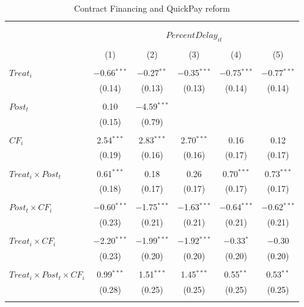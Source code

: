 \documentclass[
]{article}
\begin{document}
\begin{table}[H] \centering 
  \caption{Contract Financing and QuickPay reform} 
  \label{} 
\small 
\begin{tabular}{@{\extracolsep{-2pt}}lccccc} 
\\[-1.8ex]\hline 
\hline \\[-1.8ex] 
\\[-1.8ex] & \multicolumn{5}{c}{$PercentDelay_{it}$  } \\ 
\\[-1.8ex] & (1) & (2) & (3) & (4) & (5)\\ 
\hline \\[-1.8ex] 
 $Treat_i$ & $-$0.66$^{***}$ & $-$0.27$^{**}$ & $-$0.35$^{***}$ & $-$0.75$^{***}$ & $-$0.77$^{***}$ \\ 
  & (0.14) & (0.13) & (0.13) & (0.14) & (0.14) \\ 
  & & & & & \\ 
 $Post_t$ & 0.10 & $-$4.59$^{***}$ &  &  &  \\ 
  & (0.15) & (0.79) &  &  &  \\ 
  & & & & & \\ 
 $CF_i$ & 2.54$^{***}$ & 2.83$^{***}$ & 2.70$^{***}$ & 0.16 & 0.12 \\ 
  & (0.19) & (0.16) & (0.16) & (0.17) & (0.17) \\ 
  & & & & & \\ 
 $Treat_i \times Post_t$ & 0.61$^{***}$ & 0.18 & 0.26 & 0.70$^{***}$ & 0.73$^{***}$ \\ 
  & (0.18) & (0.17) & (0.17) & (0.17) & (0.17) \\ 
  & & & & & \\ 
 $Post_t \times CF_i$ & $-$0.60$^{***}$ & $-$1.75$^{***}$ & $-$1.63$^{***}$ & $-$0.64$^{***}$ & $-$0.62$^{***}$ \\ 
  & (0.23) & (0.21) & (0.21) & (0.21) & (0.21) \\ 
  & & & & & \\ 
 $Treat_i \times CF_i$ & $-$2.20$^{***}$ & $-$1.99$^{***}$ & $-$1.92$^{***}$ & $-$0.33$^{*}$ & $-$0.30 \\ 
  & (0.23) & (0.20) & (0.20) & (0.20) & (0.20) \\ 
  & & & & & \\ 
 $Treat_i \times Post_t \times CF_i$ & 0.99$^{***}$ & 1.51$^{***}$ & 1.45$^{***}$ & 0.55$^{**}$ & 0.53$^{**}$ \\ 
  & (0.28) & (0.25) & (0.25) & (0.25) & (0.25) \\ 
  & & & & & \\ 

\end{tabular}
\end{table}
\end{document}
